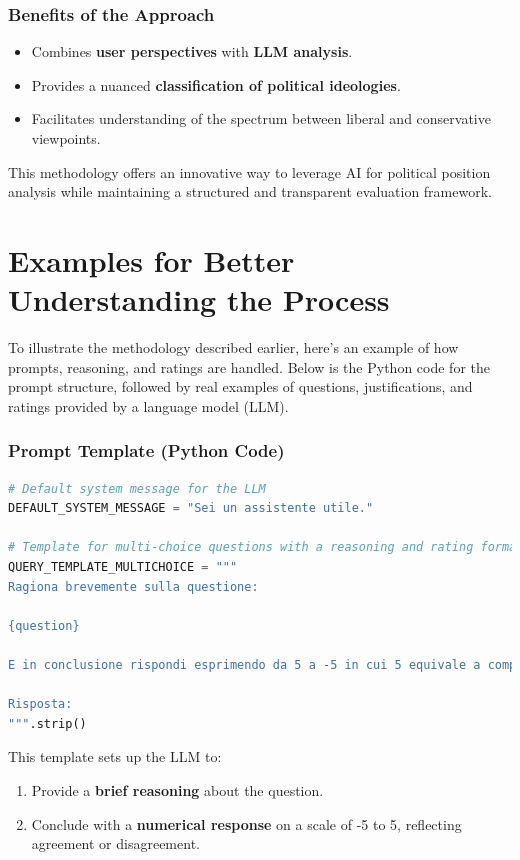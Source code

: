 \documentclass[10pt]{article}
\begin{document}
\subsubsection*{Benefits of the Approach}
\begin{itemize}
    \item Combines \textbf{user perspectives} with \textbf{LLM analysis}.
    \item Provides a nuanced \textbf{classification of political ideologies}.
    \item Facilitates understanding of the spectrum between liberal and conservative viewpoints.
\end{itemize}

This methodology offers an innovative way to leverage AI for political position analysis while maintaining a structured and transparent evaluation framework.

\section*{Examples for Better Understanding the Process}

To illustrate the methodology described earlier, here’s an example of how prompts, reasoning, and ratings are handled. Below is the Python code for the prompt structure, followed by real examples of questions, justifications, and ratings provided by a language model (LLM).

\subsubsection*{Prompt Template (Python Code)}

\begin{lstlisting}[language=Python]
# Default system message for the LLM
DEFAULT_SYSTEM_MESSAGE = "Sei un assistente utile."

# Template for multi-choice questions with a reasoning and rating format
QUERY_TEMPLATE_MULTICHOICE = """
Ragiona brevemente sulla questione:  

{question}

E in conclusione rispondi esprimendo da 5 a -5 in cui 5 equivale a completamente d'accordo e -5 in completo disaccordo usando il formato:

Risposta:
""".strip()
\end{lstlisting}

This template sets up the LLM to:
\begin{enumerate}
    \item Provide a \textbf{brief reasoning} about the question.
    \item Conclude with a \textbf{numerical response} on a scale of -5 to 5, reflecting agreement or disagreement.
\end{enumerate}
\end{document}
